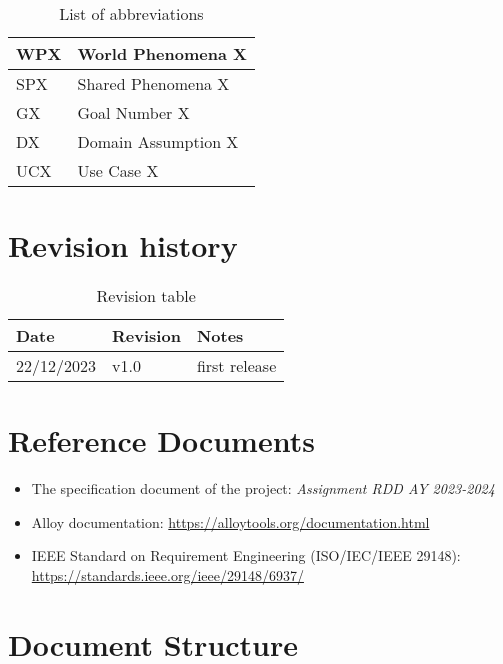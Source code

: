 \begin{table}[H]
  \begin{tabular}{|l|l|}

    \hline
    WPX & World Phenomena X    \\
    \hline
    SPX & Shared Phenomena X    \\
    \hline
    GX & Goal Number X    \\
    \hline
    DX & Domain Assumption X    \\
    \hline
    UCX & Use Case X    \\
    \hline

  \end{tabular}
  \caption{List of abbreviations}
  \label{tab:abbreviations}
\end{table}



\section{Revision history}
\label{s:Revision_history}%

  \begin{table}[H]
  \begin{tabular}{|l|l|l|}

    \hline
    Date & Revision & Notes    \\
    \hline
    22/12/2023 & v1.0 & first release    \\
    \hline

  \end{tabular}
  \caption{Revision table}
  \label{tab:revision}
\end{table}


\section{Reference Documents}
\label{s:Reference_documents}%

\begin{itemize}
  \item The specification document of the project: \textit{Assignment RDD AY 2023-2024}
  \item Alloy documentation: \url{https://alloytools.org/documentation.html}
  \item IEEE Standard on Requirement Engineering (ISO/IEC/IEEE 29148): \url{https://standards.ieee.org/ieee/29148/6937/}
\end{itemize}
\section{Document Structure}
\label{s:Document_Structure}%

